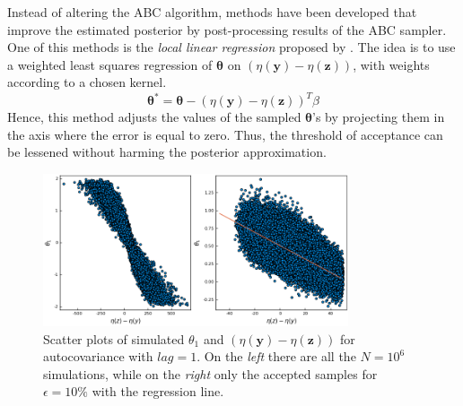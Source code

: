 \documentclass[runningheads]{llncs}
\begin{document}
Instead of altering the ABC algorithm, methods have been
developed that improve the estimated posterior
by post-processing results of the ABC sampler. One
of this methods is the
\textit{local linear regression} proposed by
\citet{Beaumont2012}.
The idea is to use a weighted least squares regression
of $\bm \theta$ on $(\eta(\bm y) - \eta(\bm z))$, with weights
according to a chosen kernel.
\begin{equation}
\bm \theta^* = \bm \theta - (\eta(\bm y) - \eta(\bm z))^T\hat\beta
\end{equation}
Hence, this method adjusts the values of the sampled $\bm \theta$'s
by projecting them in the axis where the error is equal to
zero. Thus, the threshold of acceptance can be lessened without
harming the posterior approximation.
\hfill\break

    \begin{figure}[H]
        \centering
        \includegraphics[width=9cm]{images/RegressionABC1.png}
        \caption{Scatter plots of simulated $\theta_1$ and
        $(\eta(\bm y)-\eta(\bm z))$ for autocovariance with
        $lag = 1$. On the \textit{left} there are all the
        $N=10^6$ simulations, while on the \textit{right} only the
        accepted samples for $\epsilon = 10\%$ with the regression
        line.
        }
        \label{fig:regression}
    \end{figure}
\end{document}
